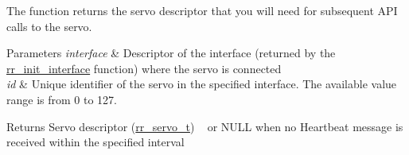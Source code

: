 The function returns the servo descriptor that you will need for subsequent A\+PI calls to the servo.


\begin{DoxyParams}{Parameters}
{\em interface} & Descriptor of the interface (returned by the \hyperlink{group___init_ga472a4890dcc7d7a13123c56a06946d91}{rr\+\_\+init\+\_\+interface} function) where the servo is connected \\
\hline
{\em id} & Unique identifier of the servo in the specified interface. The available value range is from 0 to 127. \\
\hline
\end{DoxyParams}
\begin{DoxyReturn}{Returns}
Servo descriptor (\hyperlink{structrr__servo__t}{rr\+\_\+servo\+\_\+t}) ~\newline
 or N\+U\+LL when no Heartbeat message is received within the specified interval 
\end{DoxyReturn}
